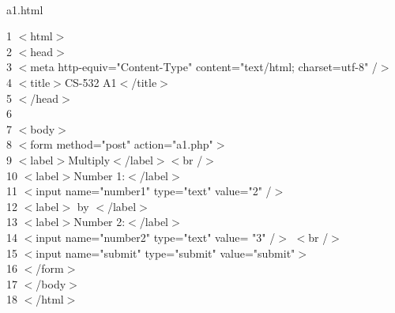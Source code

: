 \vspace*{5mm}
\\
\begin{center}
	a1.html\\
	\hdashrule{15cm}{1pt}{1pt}
\end{center}
1	 \hspace*{5mm}$<$html$>$\\
2	 \hspace*{5mm}$<$head$>$\\
3	 \hspace*{5mm}$<$meta http-equiv="Content-Type" content="text/html; charset=utf-8" /$>$\\
4	 \hspace*{5mm}$<$title$>$CS-532 A1$<$/title$>$\\
5	 \hspace*{5mm}$<$/head$>$\\
6	 \hspace*{5mm}\\
7	 \hspace*{5mm}$<$body$>$\\
8	 \hspace*{5mm}$<$form method="post" action="a1.php"$>$\\
9	 \hspace*{5mm}$<$label$>$Multiply$<$/label$><$br /$>$\\
10	 \hspace*{5mm}$<$label$>$Number 1:$<$/label$>$\\
11	 \hspace*{5mm}$<$input name="number1" type="text" value="2" /$>$ \\
12	 \hspace*{5mm}$<$label$>$ by $<$/label$>$\\
13	 \hspace*{5mm}$<$label$>$Number 2:$<$/label$>$\\
14	 \hspace*{5mm}$<$input name="number2" type="text" value= "3" /$>$ $<$br /$>$\\
15	 \hspace*{5mm}$<$input name="submit" type="submit" value="submit"$>$\\
16	 \hspace*{5mm}$<$/form$>$\\
17	 \hspace*{5mm}$<$/body$>$\\
18	 \hspace*{5mm}$<$/html$>$\\